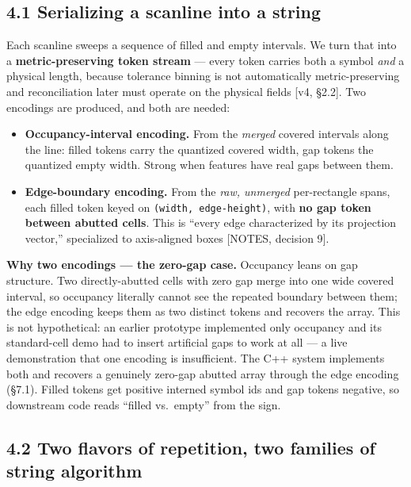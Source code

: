 \documentclass[
  11pt,
]{article}
\providecommand{\tightlist}{%
  \setlength{\itemsep}{0pt}\setlength{\parskip}{0pt}}
\begin{document}
\subsection{4.1 Serializing a scanline into a
string}\label{serializing-a-scanline-into-a-string}

Each scanline sweeps a sequence of filled and empty intervals. We turn
that into a \textbf{metric-preserving token stream} --- every token
carries both a symbol \emph{and} a physical length, because tolerance
binning is not automatically metric-preserving and reconciliation later
must operate on the physical fields {[}v4, §2.2{]}. Two encodings are
produced, and both are needed:

\begin{itemize}
\tightlist
\item
  \textbf{Occupancy-interval encoding.} From the \emph{merged} covered
  intervals along the line: filled tokens carry the quantized covered
  width, gap tokens the quantized empty width. Strong when features have
  real gaps between them.
\item
  \textbf{Edge-boundary encoding.} From the \emph{raw, unmerged}
  per-rectangle spans, each filled token keyed on
  \texttt{(width,\ edge-height)}, with \textbf{no gap token between
  abutted cells}. This is ``every edge characterized by its projection
  vector,'' specialized to axis-aligned boxes {[}NOTES, decision 9{]}.
\end{itemize}

\textbf{Why two encodings --- the zero-gap case.} Occupancy leans on gap
structure. Two directly-abutted cells with zero gap merge into one wide
covered interval, so occupancy literally cannot see the repeated
boundary between them; the edge encoding keeps them as two distinct
tokens and recovers the array. This is not hypothetical: an earlier
prototype implemented only occupancy and its standard-cell demo had to
insert artificial gaps to work at all --- a live demonstration that one
encoding is insufficient. The C++ system implements both and recovers a
genuinely zero-gap abutted array through the edge encoding (§7.1).
Filled tokens get positive interned symbol ids and gap tokens negative,
so downstream code reads ``filled vs.~empty'' from the sign.

\subsection{4.2 Two flavors of repetition, two families of string
algorithm}\label{two-flavors-of-repetition-two-families-of-string-algorithm}
\end{document}
